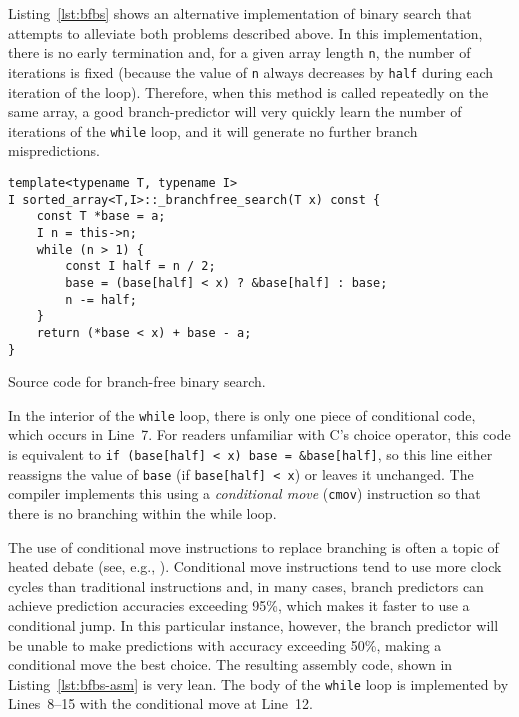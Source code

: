 \documentclass{patmorin}
\newcommand{\lstlabel}[1]{\label{lst:#1}}
\newcommand{\lstref}[1]{Listing~\ref{lst:#1}}
\newcommand{\Lstref}[1]{\lstref{#1}}
\begin{document}
\Lstref{bfbs} shows an alternative implementation of binary search
that attempts to alleviate both problems described above.  In this
implementation, there is no early termination and, for a given array
length \texttt{n}, the number of iterations is fixed (because the
value of \texttt{n} always decreases by \texttt{half}
during each iteration of the loop).  Therefore, when this method is
called repeatedly on the same array, a good branch-predictor will very
quickly learn the number of iterations of the \texttt{while}
loop, and it will generate no further branch mispredictions.

\begin{listing}
\begin{verbatim}
template<typename T, typename I>
I sorted_array<T,I>::_branchfree_search(T x) const {
    const T *base = a;
    I n = this->n;
    while (n > 1) {
        const I half = n / 2;
        base = (base[half] < x) ? &base[half] : base;
        n -= half;
    }
    return (*base < x) + base - a;
}
\end{verbatim}
\caption{Source code for branch-free binary search.}
\lstlabel{bfbs}
\end{listing}

In the interior of the \texttt{while} loop, there is only one
piece of conditional code, which occurs in Line~7.  For readers unfamiliar
with C's choice operator, this code is equivalent to \texttt{if
(base[half] < x) base = &base[half]}, so this line either reassigns
the value of \texttt{base} (if \texttt{base[half]
< x}) or leaves it unchanged.  The compiler implements this using a
\emph{conditional move} (\texttt{cmov}) instruction so that
there is no branching within the while loop.

The use of conditional move instructions to replace branching is
often a topic of heated debate (see, e.g., \cite{X}).  Conditional move
instructions tend to use more clock cycles than traditional instructions
and, in many cases, branch predictors can achieve prediction accuracies
exceeding 95\%, which makes it faster to use a conditional jump.  In this
particular instance, however, the branch predictor will be unable to make
predictions with accuracy exceeding 50\%, making a conditional move the
best choice.  The resulting assembly code, shown in \lstref{bfbs-asm} is
very lean.  The body of the \texttt{while} loop is implemented
by Lines~8--15 with the conditional move at Line~12.
\end{document}
